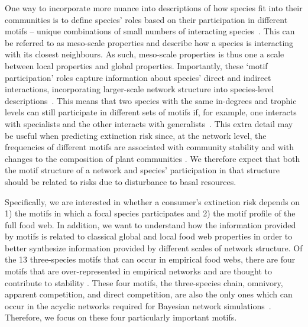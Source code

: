 \documentclass[12pt]{article}
\begin{document}
\begin{spacing}{2.0}
    One way to incorporate more nuance into descriptions of how species fit into their communities is to define species' roles based on their participation in different motifs -- unique combinations of small numbers of interacting species~\citep{Stouffer2007,Stouffer2012}. This can be referred to as meso-scale properties and describe how a species is interacting with its closest neighbours. As such, meso-scale properties is thus one a scale between local properties and global properties. Importantly, these `motif participation' roles capture information about species' direct and indirect interactions, incorporating larger-scale network structure into species-level descriptions~\citep{Cirtwill2015a}. 
    This means that two species with the same in-degrees and trophic levels can still participate in different sets of motifs if, for example, one interacts with specialists and the other interacts with generalists~\citep{Cirtwill2018FoodWebs}. 
    This extra detail may be useful when predicting  extinction risk since, at the network level, the frequencies of different motifs are associated with community stability \citep{prill2005dynamic, bascompte2005simple} and with changes to the composition of plant communities \citep{giling2019plant}. 
    We therefore expect that both the motif structure of a network and species' participation in that structure should be related to risks due to disturbance to basal resources. 
    
    Specifically, we are interested in whether a consumer's extinction risk depends on 1) the motifs in which a focal species participates and 2) the motif profile of the full food web. 
    In addition, we want to understand how the information provided by motifs is related to classical global and local food web properties in order to better synthesize information provided by different scales of network structure.
    Of the 13 three-species motifs that can occur in empirical food webs, there are four motifs that are over-represented in empirical networks and are thought to contribute to stability \citep{Stouffer2007, Borrelli2015a, giling2019plant}. These four motifs, the three-species chain, omnivory, apparent competition, and direct competition, are also the only ones which can occur in the acyclic networks required for Bayesian network simulations~\citep{Eklof2013}. 
    Therefore, we focus on these four particularly important motifs.  
    


\end{spacing}
\end{document}
